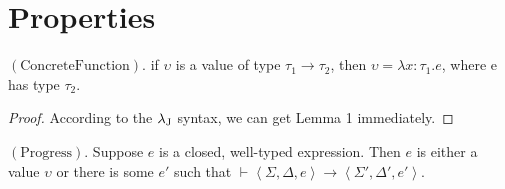 \section{Properties}
\label{property}

 \begin{lemma}
     $\mathrm{(Concrete Function)}$. if $\upsilon$ is a value of type $\tau_1\rightarrow\tau_2$, then $\upsilon= \lambda x:\tau_1.e$, where e has type $\tau_2$.
    \end{lemma}
 \begin{proof}
     According to the ${\lambda_{\text{J}}}$ syntax, we can get Lemma 1 immediately.
    \end{proof}
 
 \begin{theorem}
     $\mathrm{(Progress).}$ Suppose $e$ is a closed, well-typed expression. Then $e$ is either a value $\upsilon$ or there is some $e'$ such that $\vdash\left\langle\Sigma, \Delta, e\right\rangle\rightarrow\left\langle\Sigma',\Delta',e'\right\rangle$.
 \end{theorem}   

